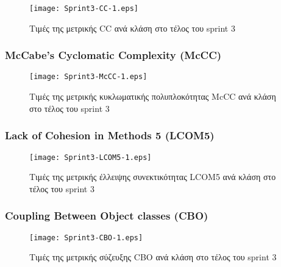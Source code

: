 \begin{figure}
\centering
\texttt{[image: Sprint3-CC-1.eps]}
\caption{Τιμές της μετρικής CC ανά κλάση στο τέλος του sprint 3}
\label{fig:sprint3CC}
\end{figure}

\subsubsection{McCabe’s Cyclomatic Complexity (McCC)}
\label{section:sprint3McCC}

\begin{figure}
\centering
\texttt{[image: Sprint3-McCC-1.eps]}
\caption{Τιμές της μετρικής κυκλωματικής πολυπλοκότητας McCC ανά κλάση στο τέλος του sprint 3}
\label{fig:sprint3McCC}
\end{figure}

\subsubsection{Lack of Cohesion in Methods 5 (LCOM5)}
\label{section:sprint3LCOM5}

\begin{figure}
\centering
\texttt{[image: Sprint3-LCOM5-1.eps]}
\caption{Τιμές της μετρικής έλλειψης συνεκτικότητας LCOM5 ανά κλάση στο τέλος του sprint 3}
\label{fig:sprint3LCOM5}
\end{figure}

\subsubsection{Coupling Between Object classes (CBO)}
\label{section:sprint3CBO}

\begin{figure}
\centering
\texttt{[image: Sprint3-CBO-1.eps]}
\caption{Τιμές της μετρικής σύζευξης CBO ανά κλάση στο τέλος του sprint 3}
\label{fig:sprint3CBO}
\end{figure}

